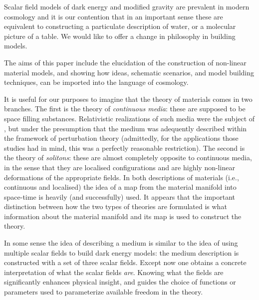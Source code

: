 Scalar field models of dark energy and modified gravity are prevalent in modern cosmology and it is our contention that in an important sense these are equivalent to constructing a particulate description of water, or a molecular picture of a table. We would like to offer a change in philosophy in building models.

The aims of this paper include the elucidation of the construction of non-linear material models, and  showing how ideas, schematic scenarios, and model building techniques, can be imported into the language of cosmology.

It is useful for our purposes to imagine that the theory of materials comes in two branches. The first is the theory of   \textit{continuous media}: these are supposed to be space filling substances. Relativistic realizations of such media were the subject of \cite{Bucher:1998mh, Battye:2007aa, Pearson:2014iaa}, but under the presumption that the medium was adequently described within the framework of perturbation theory (admittedly,  for the applications those studies had in mind, this was a perfectly reasonable restriction).  The second is the theory of \textit{solitons}: these are almost completely opposite to continuous media, in the sense that they are localised configurations and are highly non-linear deformations of the appropriate fields. In both descriptions of materials (i.e., continuous and localised) the idea of a map from the material manifold into space-time is heavily (and successfully) used. It appears that the important distinction between how the two types of theories are formulated is what information about the material manifold and its map is used to construct the theory.

In some sense the idea of describing a medium is similar to the idea of using multiple scalar fields to build dark energy models: the medium description is constructed with a set of three scalar fields. Except now one obtains a concrete interpretation of what the scalar fields \textit{are}. Knowing what the fields are significantly enhances physical insight, and guides the choice of  functions or parameters used to parameterize available freedom in the theory.



